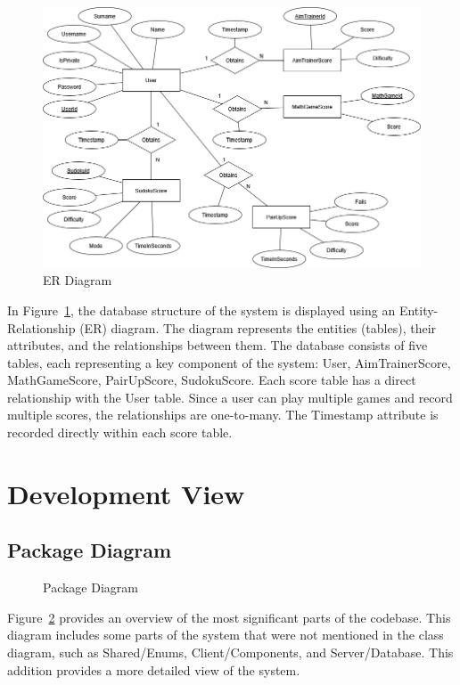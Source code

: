 \documentclass[11pt,a4paper]{article}
\newcommand{\inputdiagram}[1]{}
\newcommand{\textwidthdiagram}[2][1]{%
  \resizebox{#1\textwidth}{!}{\inputdiagram{#2}}%
}
\begin{document}
\begin{figure}[H]
    \centering
    \includegraphics[width=\textwidth]{Diagrams/out/PNG/ER_diagram.png}
    \caption{ER Diagram}
    \label{fig:ER_diagram}
\end{figure}

In Figure~\ref{fig:ER_diagram}, the database structure of the system is displayed using an Entity-Relationship (ER) diagram. The diagram represents the entities (tables), their attributes, and the relationships between them. The database consists of five tables, each representing a key component of the system: User, AimTrainerScore, MathGameScore, PairUpScore, SudokuScore. Each score table has a direct relationship with the User table. Since a user can play multiple games and record multiple scores, the relationships are one-to-many. The Timestamp attribute is recorded directly within each score table.


\section{Development View}

\subsection{Package Diagram}

\begin{figure}[H]
    \centering
    \textwidthdiagram{Package_Diagram.latex}
    \caption{Package Diagram} 
    \label{fig:united_package}
\end{figure}

Figure~\ref{fig:united_package} provides an overview of the most significant parts of the codebase. This diagram includes some parts of the system that were not mentioned in the class diagram, such as Shared/Enums, Client/Components, and Server/Database. This addition provides a more detailed view of the system.
\end{document}
